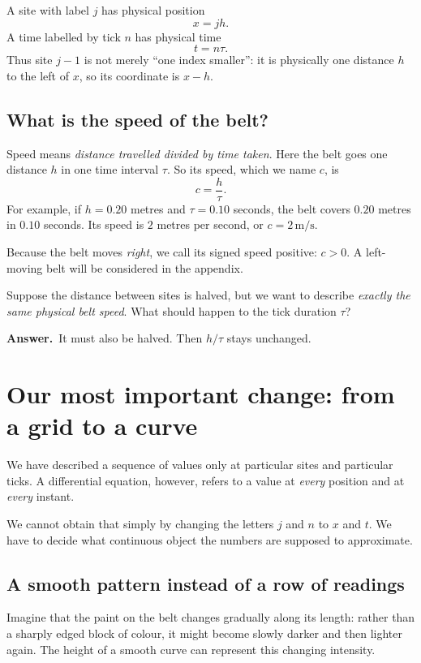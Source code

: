 \documentclass[11pt,a4paper]{article}
\newcommand{\secstart}[1]{\Needspace{7\baselineskip}\section{#1}}
\newcommand{\substart}[1]{\Needspace{5\baselineskip}\subsection{#1}}
\newcommand{\answer}{\par\smallskip\textbf{Answer.}~}
\begin{document}
A site with label $j$ has physical position
\[
\boxed{x=jh.}
\]
A time labelled by tick $n$ has physical time
\[
\boxed{t=n\tau.}
\]
Thus site $j-1$ is not merely ``one index smaller'': it is physically one distance $h$ to the left of $x$, so its coordinate is $x-h$.

\begin{center}
\end{center}
\substart{What is the speed of the belt?}
Speed means \emph{distance travelled divided by time taken}. Here the belt goes one distance $h$ in one time interval $\tau$. So its speed, which we name $c$, is
\begin{equation}
\boxed{c=\frac{h}{\tau}.}\tag{2}
\end{equation}
For example, if $h=0.20$ metres and $\tau=0.10$ seconds, the belt covers $0.20$ metres in $0.10$ seconds. Its speed is $2$ metres per second, or $c=2\,\mathrm{m/s}$.

Because the belt moves \emph{right}, we call its signed speed positive: $c>0$. A left-moving belt will be considered in the appendix.

\begin{thinkbox}
Suppose the distance between sites is halved, but we want to describe \emph{exactly the same physical belt speed}. What should happen to the tick duration $\tau$?
\answer It must also be halved. Then $h/\tau$ stays unchanged.
\end{thinkbox}

\clearpage
\secstart{Our most important change: from a grid to a curve}
We have described a sequence of values only at particular sites and particular ticks. A differential equation, however, refers to a value at \emph{every} position and at \emph{every} instant.

We cannot obtain that simply by changing the letters $j$ and $n$ to $x$ and $t$. We have to decide what continuous object the numbers are supposed to approximate.

\substart{A smooth pattern instead of a row of readings}
Imagine that the paint on the belt changes gradually along its length: rather than a sharply edged block of colour, it might become slowly darker and then lighter again. The height of a smooth curve can represent this changing intensity.
\end{document}
